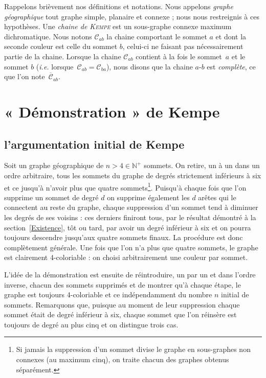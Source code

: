 \documentclass[french]{report}
\begin{document}

Rappelons brièvement nos définitions et notations. Nous appelons \textit{graphe géographique} tout graphe simple, planaire et connexe ; nous nous restreignis à ces hypothèses. Une \textit{chaine de \textsc{Kempe}} est un sous-graphe connexe maximum dichromatique. Nous notons $\mathcal{C}_{ab}$ la chaine comportant le sommet $a$ et dont la seconde couleur est celle du sommet $b$, celui-ci ne faisant pas nécessairement partie de la chaine. Lorsque la chaine $\mathcal{C}_{ab}$ contient à la fois le sommet~$a$ et le sommet $b$ (\textit{i.e.} lorsque~$\mathcal{C}_{ab}=\mathcal{C}_{ba}$), nous disons que la chaine $a$-$b$ est \textit{complète}, ce que l'on note~$\overline{\mathcal{C}}_{ab}$.

\section{« Démonstration » de Kempe}\label{sec:Kempe}
\subsection{l'argumentation initial de Kempe}

Soit un graphe géographique de $n>4\in\mathbb{N}^+$ sommets. On retire, un à un dans un ordre arbitraire, tous les sommets du graphe de degrés strictement inférieurs à six et ce jusqu'à n'avoir plus que quatre sommets\footnote{Si jamais la suppression d'un sommet divise le graphe en sous-graphes non connexes (au maximum cinq), on traite chacun des graphes obtenus séparément.}. Puisqu'à chaque fois que l'on supprime un sommet de degré $d$ on supprime également les $d$ arêtes qui le connectent au reste du graphe, chaque suppression d'un sommet tend à diminuer les degrés de ses voisins : ces derniers finiront tous, par le résultat démontré à la section~\ref{Existence}, tôt ou tard, par avoir un degré inférieur à six et on pourra toujours descendre jusqu'aux quatre sommets finaux. La procédure est donc complètement générale. Une fois que l'on n'a plus que quatre sommets, le graphe est clairement 4-coloriable : on choisi arbitrairement une couleur par sommet.

L'idée de la démonstration est ensuite de réintroduire, un par un et dans l'ordre inverse, chacun des sommets supprimés et de montrer qu'à chaque étape, le graphe est toujours 4-coloriable et ce indépendamment du nombre $n$ initial de sommets. Remarquons que, puisque au moment de leur suppression chaque sommet était de degré inférieur à six, chaque sommet que l'on réinsère est toujours de degré au plus cinq et on distingue trois cas.
\end{document}
